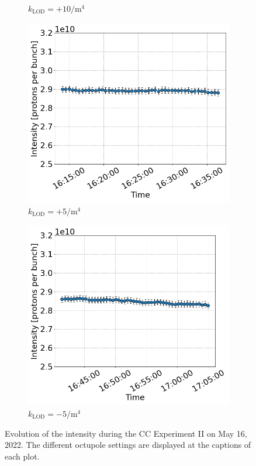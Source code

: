 \begin{figure}[htp]
\begin{subfigure}{.45\textwidth}
         \caption{$k_\mathrm{LOD}=+10  \mathrm{/m^{4}}$}
     \end{subfigure}
     \begin{subfigure}{.45\textwidth}
         \centering
         \includegraphics[width=.95\linewidth]{images/app_e/intensity_cc_md_16May22_coast_8.png}  
         \caption{$k_\mathrm{LOD}=+5  \mathrm{/m^{4}}$}
     \end{subfigure}
     \begin{subfigure}{.45\textwidth}
             \centering
             \includegraphics[width=.95\linewidth]{images/app_e/intensity_cc_md_16May22_coast_9.png}  
             \caption{$k_\mathrm{LOD}=-5 \mathrm{/m^{4}}$}
     \end{subfigure}
     \caption{Evolution of the intensity during the  CC Experiment II on May 16, 2022. The different octupole settings are displayed at the captions of each plot.}
     \label{fig:cc_md_2022_overview_plots_klod_scan_intensity_exper2}
\end{figure}


